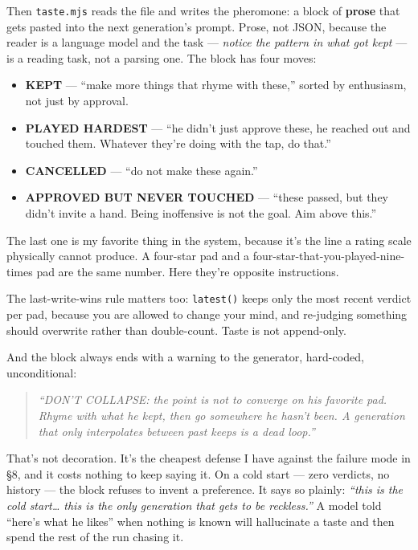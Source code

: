\documentclass[10pt,letterpaper,twocolumn]{article}
\begin{document}
Then \texttt{taste.mjs} reads the file and writes the pheromone: a block of \textbf{prose} that gets pasted into the next generation's prompt. Prose, not JSON, because the reader is a language model and the task --- \emph{notice the pattern in what got kept} --- is a reading task, not a parsing one. The block has four moves:

\begin{itemize}
  \item \textbf{KEPT} --- ``make more things that rhyme with these,'' sorted by enthusiasm, not just by approval.
  \item \textbf{PLAYED HARDEST} --- ``he didn't just approve these, he reached out and touched them. Whatever they're doing with the tap, do that.''
  \item \textbf{CANCELLED} --- ``do not make these again.''
  \item \textbf{APPROVED BUT NEVER TOUCHED} --- ``these passed, but they didn't invite a hand. Being inoffensive is not the goal. Aim above this.''
\end{itemize}

The last one is my favorite thing in the system, because it's the line a rating scale physically cannot produce. A four-star pad and a four-star-that-you-played-nine-times pad are the same number. Here they're opposite instructions.

The last-write-wins rule matters too: \texttt{latest()} keeps only the most recent verdict per pad, because you are allowed to change your mind, and re-judging something should overwrite rather than double-count. Taste is not append-only.

And the block always ends with a warning to the generator, hard-coded, unconditional:

\begin{quote}
\small\emph{``DON'T COLLAPSE: the point is not to converge on his favorite pad. Rhyme with what he kept, then go somewhere he hasn't been. A generation that only interpolates between past keeps is a dead loop.''}
\end{quote}

That's not decoration. It's the cheapest defense I have against the failure mode in \S8, and it costs nothing to keep saying it. On a cold start --- zero verdicts, no history --- the block refuses to invent a preference. It says so plainly: \emph{``this is the cold start\ldots{} this is the only generation that gets to be reckless.''} A model told ``here's what he likes'' when nothing is known will hallucinate a taste and then spend the rest of the run chasing it.
\end{document}
